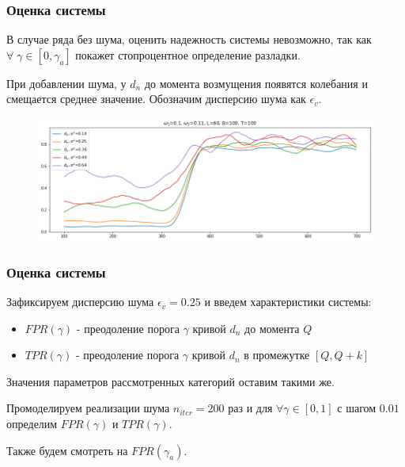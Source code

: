 \documentclass[11pt]{beamer}
\begin{document}
	\begin{frame}
		\frametitle{Оценка системы}
		В случае ряда без шума, оценить надежность системы невозможно, так как  $\forall \; \gamma \in [0, \gamma_a] $ покажет стопроцентное определение разладки.
		
		\bigskip
		При добавлении шума, у $ d_{n} $ до момента возмущения появятся колебания и смещается среднее значение. Обозначим дисперсию шума как $ \epsilon_v$.
		
		\begin{figure}[b]
			\centering
			\includegraphics[width=\linewidth]{imgs/row_diff_noise_var}
		\end{figure}
		
	\end{frame}

	\begin{frame}
		\frametitle{Оценка системы}
		Зафиксируем дисперсию шума $ \epsilon_v = 0.25 $ и введем характеристики системы:
		
		\begin{itemize}
			\item $ FPR(\gamma) $ - преодоление порога $ \gamma $ кривой $ d_n $ до момента $ Q $
			\item $ TPR(\gamma) $ - преодоление порога $ \gamma $ кривой $ d_n $ в промежутке $ [Q, Q+k] $
		\end{itemize}
		
		Значения параметров рассмотренных категорий оставим такими же. 
		
		\bigskip
		
		Промоделируем реализации шума $ n_{iter} = 200 $ раз и для $ \forall \gamma \in [0, 1] $ с шагом $ 0.01 $ определим $ FPR(\gamma) $ и $ TPR(\gamma) $.

		Также будем смотреть на $ FPR(\gamma_a) $.
		
	\end{frame}
\end{document}
